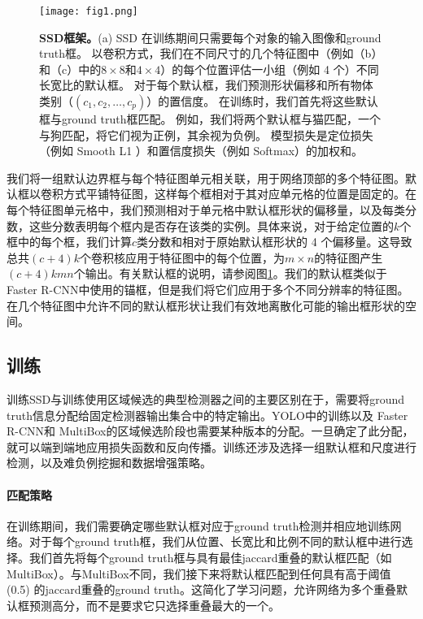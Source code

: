 \documentclass[../main.tex]{subfile}
\begin{document}
\begin{figure}[htb]
    \centering
    \texttt{[image: fig1.png]}
    \caption{\textbf{SSD框架。}(a) SSD 在训练期间只需要每个对象的输入图像和ground truth框。 以卷积方式，我们在不同尺寸的几个特征图中（例如（b）和（c）中的$ 8 \times  8 $和$ 4 \times  4$）的每个位置评估一小组（例如 4 个）不同长宽比的默认框。 对于每个默认框，我们预测形状偏移和所有物体类别（$\left( c_1, c_2, \ldots, c_p \right)$）的置信度。 在训练时，我们首先将这些默认框与ground truth框匹配。 例如，我们将两个默认框与猫匹配，一个与狗匹配，将它们视为正例，其余视为负例。 模型损失是定位损失（例如 Smooth L1 \cite{fast}）和置信度损失（例如 Softmax）的加权和。}
    \label{fig:fig1}
\end{figure}

我们将一组默认边界框与每个特征图单元相关联，用于网络顶部的多个特征图。默认框以卷积方式平铺特征图，这样每个框相对于其对应单元格的位置是固定的。在每个特征图单元格中，我们预测相对于单元格中默认框形状的偏移量，以及每类分数，这些分数表明每个框内是否存在该类的实例。具体来说，对于给定位置的$k$个框中的每个框，我们计算$ c $类分数和相对于原始默认框形状的 4 个偏移量。这导致总共$ (c + 4)k $个卷积核应用于特征图中的每个位置，为$ m \times  n $的特征图产生$ (c + 4)kmn $个输出。有关默认框的说明，请参阅图\ref{fig:fig1}。我们的默认框类似于Faster R-CNN\cite{faster}中使用的锚框，但是我们将它们应用于多个不同分辨率的特征图。在几个特征图中允许不同的默认框形状让我们有效地离散化可能的输出框形状的空间。

\subsection{训练} \label{sec:training}

训练SSD与训练使用区域候选的典型检测器之间的主要区别在于，需要将ground truth信息分配给固定检测器输出集合中的特定输出。YOLO\cite{yolo}中的训练以及 Faster R-CNN\cite{faster}和 MultiBox\cite{multibox1}的区域候选阶段也需要某种版本的分配。一旦确定了此分配，就可以端到端地应用损失函数和反向传播。训练还涉及选择一组默认框和尺度进行检测，以及难负例挖掘和数据增强策略。

\paragraph{匹配策略}

在训练期间，我们需要确定哪些默认框对应于ground truth检测并相应地训练网络。对于每个ground truth框，我们从位置、长宽比和比例不同的默认框中进行选择。我们首先将每个ground truth框与具有最佳jaccard重叠的默认框匹配（如 MultiBox\cite{multibox1}）。与MultiBox不同，我们接下来将默认框匹配到任何具有高于阈值 (0.5) 的jaccard重叠的ground truth。这简化了学习问题，允许网络为多个重叠默认框预测高分，而不是要求它只选择重叠最大的一个。
\end{document}
